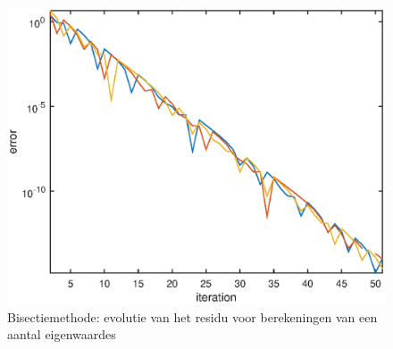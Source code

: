 \documentclass[]{article}
\begin{document}
\begin{figure}[h]
\begin{center}
\includegraphics[width=1\textwidth]{opgave8.eps}
\end{center}
\caption{Bisectiemethode: evolutie van het residu voor berekeningen van een aantal eigenwaardes}
\label{opgave8}
\end{figure}
\end{document}
